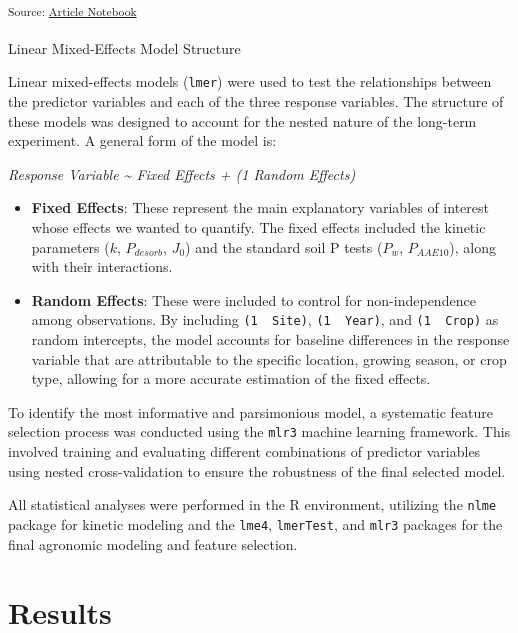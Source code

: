 \documentclass[
  a4paper,
]{article}
\makeatletter
\let\oldparagraph\paragraph
\renewcommand{\paragraph}{
    \@ifstar
      \xxxParagraphStar
      \xxxParagraphNoStar
  }
\newcommand{\xxxParagraphStar}[1]{\oldparagraph*{#1}\mbox{}}
\newcommand{\xxxParagraphNoStar}[1]{\oldparagraph{#1}\mbox{}}
\providecommand{\tightlist}{%
  \setlength{\itemsep}{0pt}\setlength{\parskip}{0pt}}
\makeatother
\begin{document}
\textsubscript{Source:
\href{https://Andrapodon.github.io/Master-Thesis-P-kinetics/index.qmd.html}{Article
Notebook}}

\paragraph{Linear Mixed-Effects Model
Structure}\label{sec-linear-mixed-effects-model-structure}

Linear mixed-effects models (\texttt{lmer}) were used to test the
relationships between the predictor variables and each of the three
response variables. The structure of these models was designed to
account for the nested nature of the long-term experiment. A general
form of the model is:

\emph{Response Variable \textasciitilde{} Fixed Effects + (1 \textbar{}
Random Effects)}

\begin{itemize}
\tightlist
\item
  \textbf{Fixed Effects}: These represent the main explanatory variables
  of interest whose effects we wanted to quantify. The fixed effects
  included the kinetic parameters (\(k\), \(P_{desorb}\), \(J_0\)) and
  the standard soil P tests (\(P_w\), \(P_{AAE10}\)), along with their
  interactions.
\item
  \textbf{Random Effects}: These were included to control for
  non-independence among observations. By including
  \texttt{(1\ \textbar{}\ Site)}, \texttt{(1\ \textbar{}\ Year)}, and
  \texttt{(1\ \textbar{}\ Crop)} as random intercepts, the model
  accounts for baseline differences in the response variable that are
  attributable to the specific location, growing season, or crop type,
  allowing for a more accurate estimation of the fixed effects.
\end{itemize}

To identify the most informative and parsimonious model, a systematic
feature selection process was conducted using the \texttt{mlr3} machine
learning framework. This involved training and evaluating different
combinations of predictor variables using nested cross-validation to
ensure the robustness of the final selected model.

All statistical analyses were performed in the R environment, utilizing
the \texttt{nlme} package for kinetic modeling and the \texttt{lme4},
\texttt{lmerTest}, and \texttt{mlr3} packages for the final agronomic
modeling and feature selection.

\section{Results}\label{results}
\end{document}
